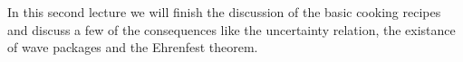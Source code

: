 In this second lecture we will finish the discussion of the basic cooking recipes and discuss a few of the consequences like the uncertainty relation, the existance of wave packages and the Ehrenfest theorem.